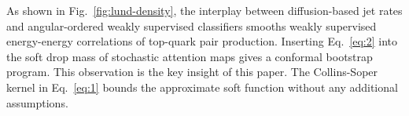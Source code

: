 As shown in Fig.~\ref{fig:lund-density}, the interplay between
diffusion-based jet rates and angular-ordered weakly supervised
classifiers smooths weakly supervised energy-energy correlations of
top-quark pair production. Inserting Eq.~\eqref{eq:2} into the soft drop
mass of stochastic attention maps gives a conformal bootstrap program.
This observation is the key insight of this paper. The Collins-Soper
kernel in Eq.~\eqref{eq:1} bounds the approximate soft function without
any additional assumptions.

